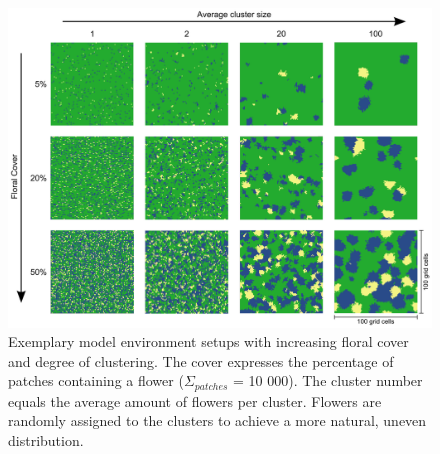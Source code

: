\begin{figure} [h] %
	\centering
	\includegraphics[width=15cm]{Images/cluster}
	\caption{ Exemplary model environment setups with increasing floral cover and degree of clustering. The cover expresses the percentage of patches containing a flower ($\Sigma_{patches}$ = 10 000). The cluster number equals the average amount of flowers per cluster. Flowers are randomly assigned to the clusters to achieve a more natural, uneven distribution. }
	\label{fig:cluster}
\end{figure}

